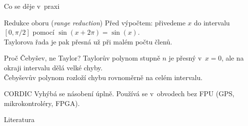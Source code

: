 \documentclass[12pt]{beamer}
\begin{document}
\begin{frame}{Co se děje v~praxi}

    \begin{block}{Redukce oboru (\emph{range reduction})}
        Před výpočtem: přivedeme $x$ do intervalu
        $[0, \pi/2]$ pomocí $\sin(x + 2\pi) = \sin(x)$.\\
        Taylorova řada je pak přesná už při malém počtu členů.
    \end{block}

    \pause

    \begin{exampleblock}{Proč Čebyšev, ne Taylor?}
        Taylorův polynom stupně $n$ je přesný v~$x = 0$,
        ale na okraji intervalu dělá velké chyby.\\
        Čebyševův polynom rozloží chybu rovnoměrně
        na celém intervalu.
    \end{exampleblock}

    \pause

    \begin{alertblock}{CORDIC}
        Vyhýbá se násobení úplně.
        Používá se v~obvodech bez FPU
        (GPS, mikrokontroléry, FPGA).
    \end{alertblock}

\end{frame}

\begin{frame}[allowframebreaks]{Literatura}
    \printbibliography[heading=none]
\end{frame}
\end{document}
